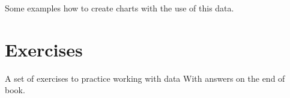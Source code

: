 Some examples how to create charts with the use of this data. 

\section{Exercises}

A set of exercises to practice working with data
With answers on the end of book.

